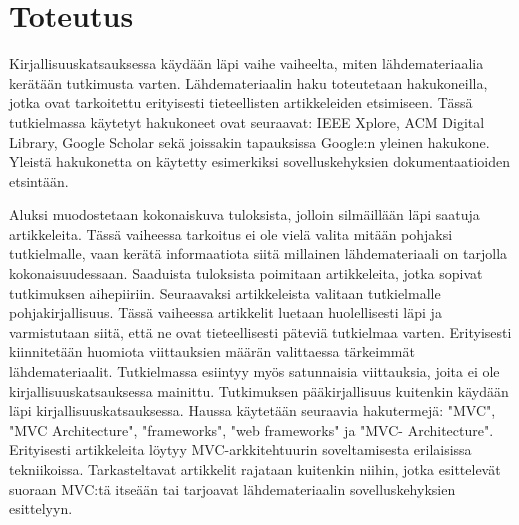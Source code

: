 \documentclass[utf8]{gradu3}
\begin{document}
\section{Toteutus}
Kirjallisuuskatsauksessa käydään läpi vaihe vaiheelta, miten
lähdemateriaalia kerätään tutkimusta varten. Lähdemateriaalin 
haku toteutetaan hakukoneilla, jotka ovat tarkoitettu erityisesti 
tieteellisten artikkeleiden etsimiseen. Tässä tutkielmassa käytetyt 
hakukoneet ovat seuraavat: IEEE Xplore, ACM Digital Library, 
Google Scholar sekä joissakin tapauksissa Google:n yleinen
hakukone. Yleistä hakukonetta on käytetty esimerkiksi
sovelluskehyksien dokumentaatioiden etsintään.

Aluksi muodostetaan kokonaiskuva tuloksista, jolloin silmäillään läpi
saatuja artikkeleita. Tässä vaiheessa tarkoitus ei ole vielä valita
mitään pohjaksi tutkielmalle, vaan kerätä informaatiota siitä
millainen lähdemateriaali on tarjolla kokonaisuudessaan. Saaduista 
tuloksista poimitaan artikkeleita, jotka sopivat tutkimuksen aihepiiriin.
Seuraavaksi artikkeleista valitaan tutkielmalle
pohjakirjallisuus. Tässä vaiheessa artikkelit luetaan huolellisesti
läpi ja varmistutaan siitä, että ne ovat tieteellisesti päteviä
tutkielmaa varten. Erityisesti kiinnitetään huomiota viittauksien
määrän valittaessa tärkeimmät lähdemateriaalit. Tutkielmassa esiintyy myös satunnaisia viittauksia,
joita ei ole kirjallisuuskatsauksessa mainittu. Tutkimuksen
pääkirjallisuus kuitenkin käydään läpi kirjallisuuskatsauksessa.
Haussa käytetään seuraavia hakutermejä: "MVC", "MVC Architecture",
"frameworks", "web frameworks" ja  "MVC- Architecture". Erityisesti artikkeleita löytyy
MVC-arkkitehtuurin soveltamisesta erilaisissa
tekniikoissa. Tarkasteltavat artikkelit rajataan kuitenkin niihin,
jotka esittelevät suoraan MVC:tä itseään tai tarjoavat
lähdemateriaalin sovelluskehyksien esittelyyn.
\end{document}

